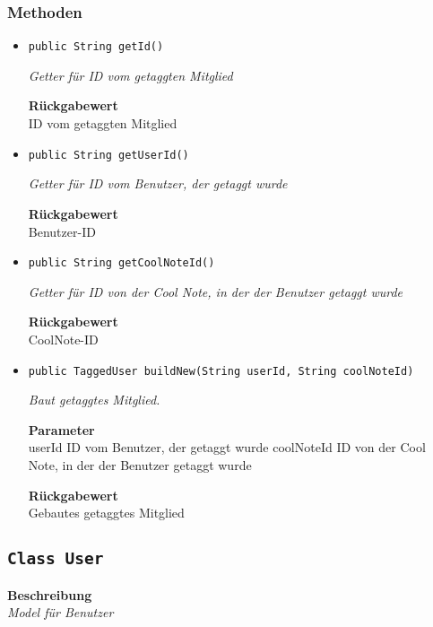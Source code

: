     \subsubsection*{Methoden}
    \begin{itemize}
    	\item{\texttt{public String getId()}}
    	
    	\textit{Getter für ID vom getaggten Mitglied}
    	
    	
    	
    	\textbf{Rückgabewert} \\
    	ID vom getaggten Mitglied        \item{\texttt{public String getUserId()}}
    	
    	\textit{Getter für ID vom Benutzer, der getaggt wurde}
    	
    	
    	
    	\textbf{Rückgabewert} \\
    	Benutzer-ID        \item{\texttt{public String getCoolNoteId()}}
    	
    	\textit{Getter für ID von der Cool Note, in der der Benutzer getaggt wurde}
    	
    	
    	
    	\textbf{Rückgabewert} \\
    	CoolNote-ID        \item{\texttt{public TaggedUser buildNew(String userId, String coolNoteId)}}
    	
    	\textit{Baut getaggtes Mitglied.}
    	
    	\textbf{Parameter} \\
    	userId ID vom Benutzer, der getaggt wurde
    	coolNoteId ID von der Cool Note, in der der Benutzer getaggt wurde
    	
    	\textbf{Rückgabewert} \\
    	Gebautes getaggtes Mitglied
    \end{itemize}
    \subsection{\texttt{Class User}}
    \textbf{Beschreibung} \\
    \textit{Model für Benutzer}
